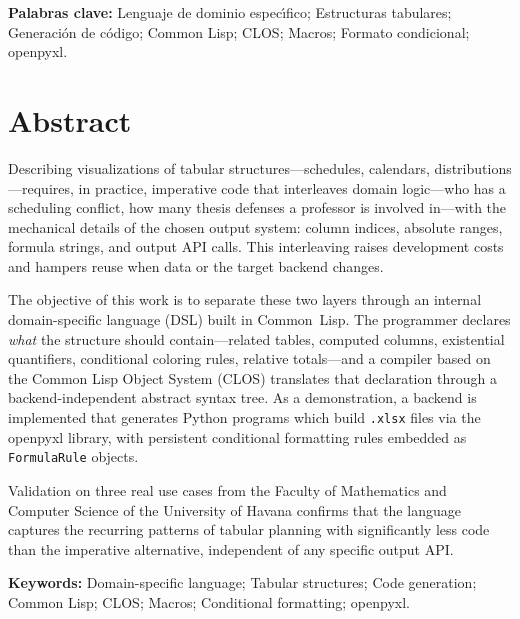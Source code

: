 \documentclass[12pt,a4paper]{report}
\theoremstyle{defstyle}
\newcommand{\xlsx}{\texttt{.xlsx}}
\begin{document}
\medskip\noindent
\textbf{Palabras clave:} Lenguaje de dominio espec\'{\i}fico; Estructuras
tabulares; Generaci\'on de c\'odigo; Common Lisp; CLOS; Macros;
Formato condicional; openpyxl.
\newpage

\chapter*{Abstract}
\thispagestyle{plain}

Describing visualizations of tabular structures---schedules, calendars,
distributions---requires, in practice, imperative code that interleaves
domain logic---who has a scheduling conflict, how many thesis defenses a
professor is involved in---with the mechanical details of the chosen output
system: column indices, absolute ranges, formula strings, and output API calls.
This interleaving raises development costs and hampers reuse when data or
the target backend changes.

The objective of this work is to separate these two layers through an
internal domain-specific language (DSL) built in Common~Lisp.  The
programmer declares \emph{what} the structure should contain---related
tables, computed columns, existential quantifiers, conditional coloring
rules, relative totals---and a compiler based on the Common Lisp Object
System (CLOS) translates that declaration through a backend-independent
abstract syntax tree.  As a demonstration, a backend is implemented that
generates Python programs which build \xlsx{} files via the openpyxl
library, with persistent conditional formatting rules embedded as
\texttt{FormulaRule} objects.

Validation on three real use cases from the Faculty of Mathematics and
Computer Science of the University of Havana confirms that the language
captures the recurring patterns of tabular planning with significantly
less code than the imperative alternative, independent of any specific
output API.

\medskip\noindent
\textbf{Keywords:} Domain-specific language; Tabular structures;
Code generation; Common Lisp; CLOS; Macros;
Conditional formatting; openpyxl.
\newpage

\tableofcontents
\newpage
\end{document}
